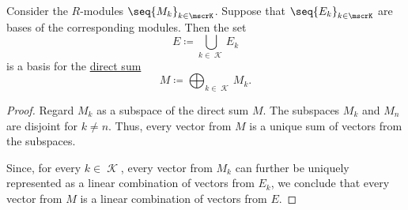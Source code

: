\begin{proposition}\label{thm:basis_of_direct_sum}
  Consider the \( R \)-modules \( \seq{ M_k }_{k \in \mscrK} \). Suppose that \( \seq{ E_k }_{k \in \mscrK} \) are bases of the corresponding modules. Then the set
  \begin{equation*}
    E \coloneqq \bigcup_{k \in \mscrK} E_k
  \end{equation*}
  is a basis for the \hyperref[def:semimodule_direct_product]{direct sum}
  \begin{equation*}
    M \coloneqq \bigoplus_{k \in \mscrK} M_k.
  \end{equation*}
\end{proposition}
\begin{proof}
  Regard \( M_k \) as a subspace of the direct sum \( M \). The subspaces \( M_k \) and \( M_n \) are disjoint for \( k \neq n \). Thus, every vector from \( M \) is a unique sum of vectors from the subspaces.

  Since, for every \( k \in \mscrK \), every vector from \( M_k \) can further be uniquely represented as a linear combination of vectors from \( E_k \), we conclude that every vector from \( M \) is a linear combination of vectors from \( E \).
\end{proof}

